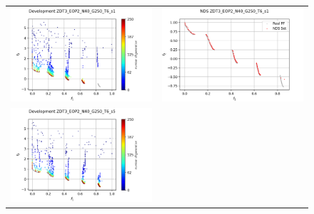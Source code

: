 \begin{figure}[H]
    \centering
    \begin{tabular}{c c}
    \includegraphics[scale=0.5]{figures/ZDT3_EOP2_N40_G250_T6/s1_dev.png} &
    \includegraphics[scale=0.5]{figures/ZDT3_EOP2_N40_G250_T6/s1_nds.png}\\
    \includegraphics[scale=0.5]{figures/ZDT3_EOP2_N40_G250_T6/s5_dev.png} &

\end{tabular}
\end{figure}
